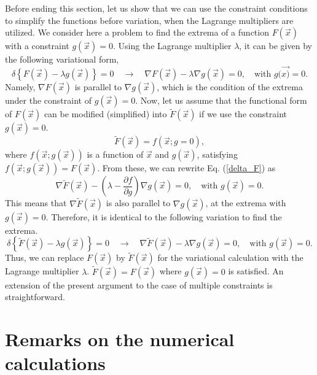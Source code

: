 \documentclass[twoside]{article}
\begin{document}
{Before ending this section, let us show that we can use
the constraint conditions to simplify the functions
before variation, when the Lagrange multipliers are utilized.
We consider here a problem to find the extrema of a function $F(\vec{x})$
with a constraint $g(\vec{x})=0$.
Using the Lagrange multiplier $\lambda$, it can be given by the
following variational form,
\begin{equation}
\label{delta_F}
\delta \left\{ F(\vec{x})-\lambda g(\vec{x}) \right\} = 0 
\quad\rightarrow\quad
{\nabla} F(\vec{x}) - \lambda {\nabla} g(\vec{x}) = 0 ,
\quad\textrm{with } g(\vec{x)}=0 .
\end{equation}
Namely, ${\nabla} F(\vec{x})$ is parallel to ${\nabla} g(\vec{x})$,
which is the condition of the extrema under the constraint of $g(\vec{x})=0$.
Now, let us assume that the functional form of $F(\vec{x})$ can be
modified (simplified) into $\tilde{F}(\vec{x})$
if we use the constraint $g(\vec{x})=0$.
\begin{equation}
\tilde{F}(\vec{x})={f}(\vec{x};g=0) ,
\end{equation}
where ${f}(\vec{x};g(\vec{x}))$ is a function of $\vec{x}$ and
$g(\vec{x})$, satisfying
${f}(\vec{x};g(\vec{x}))=F(\vec{x})$.
From these, we can rewrite Eq. (\ref{delta_F}) as
\begin{equation}
{\nabla} \tilde{F}(\vec{x}) - 
\left(
\lambda -\frac{\partial {f}}{\partial g}
\right)
{\nabla} g(\vec{x}) 
= 0 ,
\quad\textrm{with } g(\vec{x})=0 .
\end{equation}
This means that ${\nabla} \tilde{F}(\vec{x})$
is also parallel to ${\nabla} g(\vec{x})$,
at the extrema with $g(\vec{x})=0$.
Therefore, it is identical to the following variation to find the extrema.
\begin{equation}
\delta \left\{ \tilde{F}(\vec{x})-\lambda g(\vec{x}) \right\} = 0 
\quad\rightarrow\quad
{\nabla} \tilde{F}(\vec{x}) - \lambda {\nabla} g(\vec{x}) = 0 ,
\quad\textrm{with } g(\vec{x})=0 .
\end{equation}
Thus, we can replace $F(\vec{x})$ by $\tilde{F}(\vec{x})$ for
the variational calculation with the Lagrange multiplier $\lambda$.
$\tilde{F}(\vec{x})=F(\vec{x})$ where $g(\vec{x})=0$
is satisfied.
An extension of the present argument to the case of multiple constraints
is straightforward.



\section{Remarks on the numerical calculations}
\label{sec: numerical}

}
\end{document}
